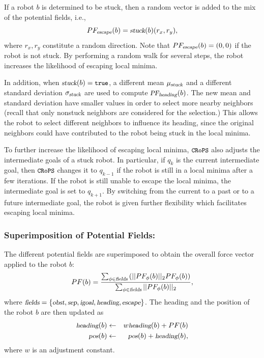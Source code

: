 \documentclass{llncs}
\newcommand{\Acronym}[1]{\ensuremath{{\small{\texttt{#1}}}}}
\newcommand{\Constant}[1]{\ensuremath{\small{\texttt{#1}}}}
\newcommand{\Var}[1]{\ensuremath{{\small{\textsl{#1}}}}}
\newcommand{\True}{\Constant{true}}
\newcommand{\Name}{\Acronym{CRoPS}}
\begin{document}
If a robot $b$ is determined to be stuck, then a random vector is added
to the mix of the potential fields, i.e.,
$$
PF_\Var{escape}(b) = \Var{stuck}(b) (r_x, r_y),
$$
where $r_x, r_y$ constitute a random direction. Note that
$PF_\Var{escape}(b) = (0, 0)$ if the robot is not stuck. By performing a random walk for
several steps, the robot increases the likelihood of escaping local
minima.

In addition, when $\Var{stuck}(b) = \True$, a different mean
$\mu_\Var{stuck}$ and a different standard deviation
$\sigma_\Var{stuck}$ are used to compute
$\Var{PF}_\Var{heading}(b)$. The new mean and standard deviation have
smaller values in order to select more nearby neighbors (recall that
only nonstuck neighbors are considered for the selection.)  This
allows the robot to select different neighbors to influence its
heading, since the original neighbors could have contributed to the robot being
stuck in the local minima.

To further increase the likelihood of escaping local minima, $\Name$
also adjusts the intermediate goals of a stuck robot. In
particular, if $q_k$ is the current intermediate goal, then $\Name$
changes it to $q_{k-1}$ if the robot is still in a local minima after a
few iterations.  If the robot is still unable to escape the local
minima, the intermediate goal is set to $q_{k+1}$. By switching from
the current to a past or to a future intermediate goal, the robot is
given further flexibility which facilitates escaping local minima.


\subsubsection{Superimposition of Potential Fields:}
\label{sec:All}
The different potential fields are superimposed to obtain the overall force
vector applied to the robot $b$: 
$$
PF(b) = \frac{\sum_{\phi \in \Var{fields}} \left(|| PF_\phi(b)||_2
  PF_\phi(b)\right)}{\sum_{\phi \in \Var{fields}} || PF_\phi(b)||_2},
$$
where $\Var{fields} = \{\Var{obst}, \Var{sep}, \Var{igoal},
\Var{heading}, \Var{escape}\}$.
The heading and the position of the robot $b$ are then updated as
\begin{eqnarray*}
\Var{heading}(b) &\leftarrow& w \Var{heading}(b) + PF(b)\\
\Var{pos}(b) &\leftarrow& \Var{pos}(b) + \Var{heading}(b),
\end{eqnarray*}
where $w$ is an adjustment constant. 
\end{document}
